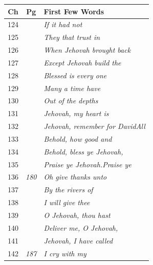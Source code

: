 \documentclass{article}
\newlength{\minipageheight}
\newlength{\minipagewidth}
\begin{document}
\begin{minipage}[r][\minipageheight][t]{\minipagewidth}%
    \begin{longtable}{ccl}
        \textbf{Ch} & \textbf{Pg}  & \textbf{First Few Words}                   \\%
        \hline%
        \endfirsthead%
        124         &              & \textit{If it had not}                     \\
        125         &              & \textit{They that trust in}                \\
        126         &              & \textit{When Jehovah brought back}         \\
        127         &              & \textit{Except Jehovah build the}          \\
        128         &              & \textit{Blessed is every one}              \\
        129         &              & \textit{Many a time have}                  \\
        130         &              & \textit{Out of the depths}                 \\
        131         &              & \textit{Jehovah, my heart is}              \\
        132         &              & \textit{Jehovah, remember for DavidAll}    \\
        133         &              & \textit{Behold, how good and}              \\
        134         &              & \textit{Behold, bless ye Jehovah,}         \\
        135         &              & \textit{Praise ye Jehovah.Praise ye}       \\
        136         & \textit{180} & \textit{Oh give thanks unto}               \\
        137         &              & \textit{By the rivers of}                  \\
        138         &              & \textit{I will give thee}                  \\
        139         &              & \textit{O Jehovah, thou hast}              \\
        140         &              & \textit{Deliver me, O Jehovah,}            \\
        141         &              & \textit{Jehovah, I have called}            \\
        142         & \textit{187} & \textit{I cry with my}                     \\

\end{longtable}
\end{minipage}
\end{document}
